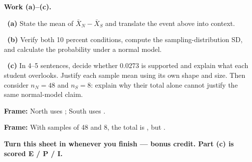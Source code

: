 \documentclass[11pt]{article}
\begin{document}
\newpage
\textbf{Work (a)--(c).}\par\smallskip

~\textbf{(a)} State the mean of $\bar X_N-\bar X_S$ and translate the event above into context.\par
\workspace{0.8in}

~\textbf{(b)} Verify both 10 percent conditions, compute the sampling-distribution SD, and calculate the probability under a normal model.\par
\workspace{1.4in}

~\textbf{(c)} In 4--5 sentences, decide whether 0.0273 is supported and explain what each student overlooks. Justify each sample mean using its own shape and size. Then consider $n_N=48$ and $n_S=8$: explain why their total alone cannot justify the same normal-model claim.\par
\workspace{2.0in}

\begin{sentenceframebox}\raggedright\textbf{Frame:} North uses \blank[1.8in]; South uses \blank[1.8in].\end{sentenceframebox}

\begin{sentenceframebox}\raggedright\textbf{Frame:} With samples of 48 and 8, the total is \blank[0.6in], but \blank[2.8in].\end{sentenceframebox}

\textbf{Turn this sheet in whenever you finish --- bonus credit. Part (c) is scored E / P / I.}\par
\end{document}
